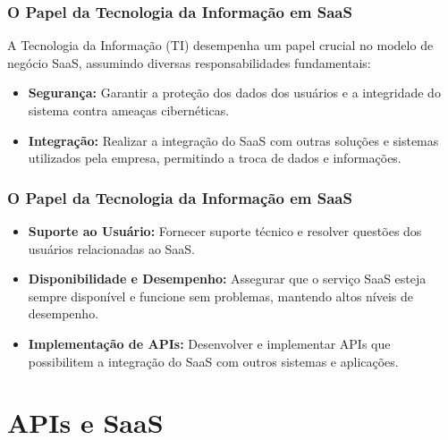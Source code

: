 \documentclass{beamer}
\begin{document}
\begin{frame}
	\frametitle{O Papel da Tecnologia da Informação em SaaS}

	A Tecnologia da Informação (TI) desempenha um papel crucial no modelo de negócio SaaS, assumindo diversas responsabilidades fundamentais:

	\begin{itemize}
		\item \textbf{Segurança:} Garantir a proteção dos dados dos usuários e a integridade do sistema contra ameaças cibernéticas.
		\item \textbf{Integração:} Realizar a integração do SaaS com outras soluções e sistemas utilizados pela empresa, permitindo a troca de dados e informações.
	\end{itemize}


\end{frame}
\begin{frame}
	\frametitle{O Papel da Tecnologia da Informação em SaaS}

	\begin{itemize}
		\item \textbf{Suporte ao Usuário:} Fornecer suporte técnico e resolver questões dos usuários relacionadas ao SaaS.
		\item \textbf{Disponibilidade e Desempenho:} Assegurar que o serviço SaaS esteja sempre disponível e funcione sem problemas, mantendo altos níveis de desempenho.
		\item \textbf{Implementação de APIs:} Desenvolver e implementar APIs que possibilitem a integração do SaaS com outros sistemas e aplicações.
	\end{itemize}


\end{frame}

\section{APIs e SaaS}
\end{document}
